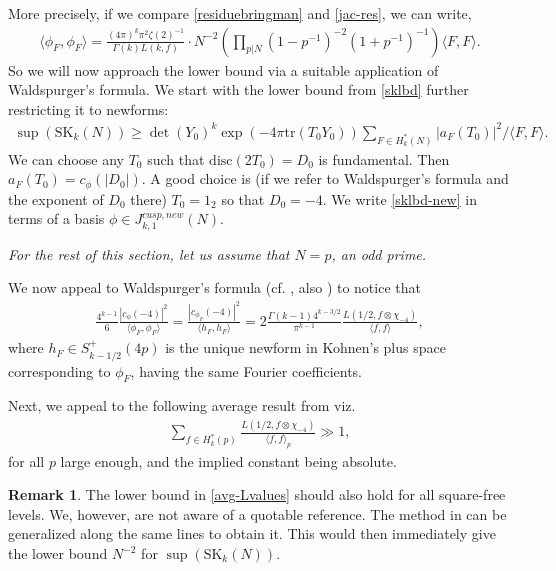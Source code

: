 \documentclass[11pt]{amsart}
\numberwithin{equation}{section}
\theoremstyle{plain}
\theoremstyle{definition}
\newtheorem{rmk}[thm]{Remark}
\newcommand{\mrm}{\mathrm}
\newcommand{\tr}{\mathrm{tr}}
\newcommand{\lan}{\langle }
\newcommand{\ran}{\rangle}
\newcommand{\sumn}{\sum \nolimits}
\newcommand{\skkn}{\mrm{SK}_k(N)}
\begin{document}
More precisely, if we compare \eqref{residuebringman} and \eqref{jac-res}, we can write,
\begin{align} \label{petreln}
   \lan \phi_F, \phi_F \ran = \frac{(4\pi)^k \pi^2  \zeta(2)^{-1}}{\Gamma(k) L(k,f)} \cdot N^{-2} \left(\prod\nolimits_{p|N}(1-p^{-1})^{-2}(1+p^{-1})^{-1} \right) \lan F, F \ran .
\end{align}
So we will now approach the lower bound via a suitable application of Waldspurger's formula. We start with the lower bound from \eqref{sklbd} further restricting it to newforms:
\begin{align} \label{sklbd-new}
    \sup(\skkn) \ge    \det(Y_0)^k \exp(-4 \pi \tr(T_0Y_0)) \sumn_{F \in H^*_k(N)} |a_F(T_0)|^2 \big /\lan F, F \ran.
\end{align}
We can choose any $T_0$ such that $\mrm{disc}(2 T_0)=D_0$ is fundamental. Then $a_F(T_0)=c_\phi(|D_0|)$.
A good choice is (if we refer to Waldspurger's formula and the exponent of $D_0$ there) $T_0=1_2$ so that $D_0=-4$. 
We write \eqref{sklbd-new} in terms of a basis $ \phi \in J_{k,1}^{cusp,new}(N)$. 

\textit{For the rest of this section, let us assume that $N=p$, an odd prime.}

We now appeal to Waldspurger's formula (cf. \cite{KZ}, also \cite[Theorem 3.13]{DPSS}) to notice that 
\begin{align} \label{wald}
\frac{4^{k-1}}{6} \frac{ |c_\phi(-4)|^2}{\lan \phi_F,\phi_F \ran} = \frac{ |c_{\phi_F}(-4)|^2}{\lan h_F,h_F \ran} = 2 \frac{\Gamma(k-1) 4^{k-3/2}}{\pi^{k-1}}\frac{ L (1/2, f \otimes \chi_{-4}) }{\lan f,f \ran} , 
\end{align}
where $h_F \in S^+_{k-1/2}(4p)$ is the unique newform in Kohnen's plus space corresponding to $\phi_F$, having the same Fourier coefficients. 

Next, we appeal to the following average result from \cite[Theorem~1.5~(1)]{PASD} viz.
\begin{align} \label{avg-Lvalues}
    \sumn_{f \in H^*_k(p)} \frac{L(1/2, f \otimes \chi_{-4}) }{\lan f,f \ran_p} \gg 1, 
\end{align}
for all $p$ large enough, and the implied constant being absolute. 

\begin{rmk} \label{sq-free-central}
   The lower bound in \eqref{avg-Lvalues} should also hold for all square-free levels. We, however, are not aware of a quotable reference. The method in \cite{PASD} can be generalized along the same lines to obtain it. This would then immediately give the lower bound $N^{-2}$ for $\sup(\skkn)$. 
\end{rmk}
\end{document}
